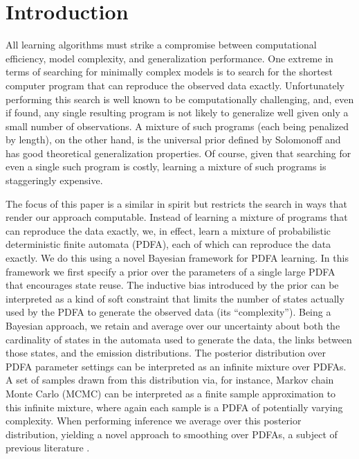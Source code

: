 \section{Introduction}
All learning algorithms must strike a compromise between computational efficiency, model complexity, and generalization performance.  One extreme in terms of searching for minimally complex models is to search for the shortest computer program that can reproduce the observed data exactly. Unfortunately performing this search is well known to be computationally challenging, and, even if found, any single resulting program is not likely to generalize well given only a small number of observations.   A mixture of such programs (each being penalized by length), on the other hand, is the universal prior defined by Solomonoff \cite{Solomonoff1964,Solomonoff1978} and has good theoretical generalization properties.  Of course, given that searching for even a single such program is costly, learning a mixture of such programs is staggeringly expensive.  

The focus of this paper is a similar in spirit but restricts the search in ways that render our approach computable.  Instead of learning a mixture of programs that can reproduce the data exactly, we, in effect, learn a mixture of probabilistic deterministic finite automata (PDFA), each of which can reproduce the data exactly.   We do this using a novel Bayesian framework for PDFA learning.  In this framework we first specify a prior over the parameters of a single large PDFA that encourages state reuse.  The inductive bias introduced by the prior can be interpreted as a kind of soft constraint that limits the number of states actually used by the PDFA to generate the observed data (its ``complexity'').   Being a Bayesian approach, we retain and average over our uncertainty about both the cardinality of states in the automata used to generate the data, the links between those states, and the emission distributions.  The posterior distribution over PDFA parameter settings can be interpreted as an infinite mixture over PDFAs.  A set of samples drawn from this distribution via, for instance, Markov chain Monte Carlo (MCMC) can be interpreted as a finite sample approximation to this infinite mixture, where again each sample is a PDFA of potentially varying complexity.  When performing inference we average over this posterior distribution, yielding a novel approach to smoothing over PDFAs, a subject of previous literature  \cite{pdfa_smoothing_approaches}. %

